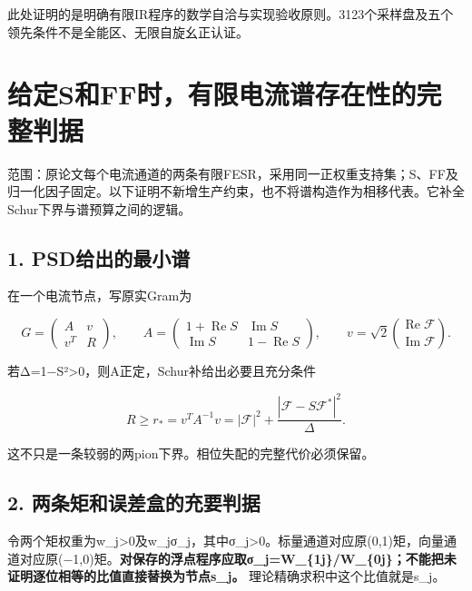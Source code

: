 \documentclass[
  10pt,
  a4paper,
]{article}
\begin{document}
此处证明的是明确有限IR程序的数学自洽与实现验收原则。3123个采样盘及五个领先条件不是全能区、无限自旋幺正认证。

\newpage

\section{给定S和FF时，有限电流谱存在性的完整判据}\label{ux7ed9ux5b9asux548cffux65f6ux6709ux9650ux7535ux6d41ux8c31ux5b58ux5728ux6027ux7684ux5b8cux6574ux5224ux636e}

范围：原论文每个电流通道的两条有限FESR，采用同一正权重支持集；S、FF及归一化因子固定。以下证明不新增生产约束，也不将谱构造作为相移代表。它补全Schur下界与谱预算之间的逻辑。

\subsection{1.
PSD给出的最小谱}\label{psdux7ed9ux51faux7684ux6700ux5c0fux8c31}

在一个电流节点，写原实Gram为

\[
G=\begin{pmatrix}A&v\\v^T&R\end{pmatrix},\qquad
A=\begin{pmatrix}1+\operatorname{Re}S&\operatorname{Im}S\\
\operatorname{Im}S&1-\operatorname{Re}S\end{pmatrix},\qquad
v=\sqrt2\binom{\operatorname{Re}\mathcal F}{\operatorname{Im}\mathcal F}.
\]

若Δ=1−\textbar S\textbar²\textgreater0，则A正定，Schur补给出必要且充分条件

\[
R\ge r_*=v^TA^{-1}v
=|\mathcal F|^2+\frac{|\mathcal F-S\mathcal F^*|^2}{\Delta}.
\]

这不只是一条较弱的两pion下界。相位失配的完整代价必须保留。

\subsection{2.
两条矩和误差盒的充要判据}\label{ux4e24ux6761ux77e9ux548cux8befux5deeux76d2ux7684ux5145ux8981ux5224ux636e}

令两个矩权重为w\_j\textgreater0及w\_jσ\_j，其中σ\_j\textgreater0。标量通道对应原(0,1)矩，向量通道对应原(−1,0)矩。\textbf{对保存的浮点程序应取σ\_j=W\_\{1j\}/W\_\{0j\}；不能把未证明逐位相等的比值直接替换为节点s\_j。}
理论精确求积中这个比值就是s\_j。
\end{document}
